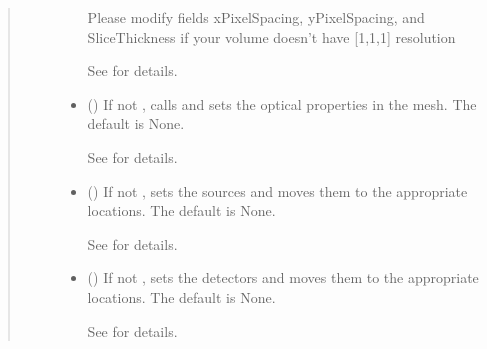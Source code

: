 \documentclass[letterpaper,10pt,english]{sphinxmanual}
\begin{document}
\begin{fulllineitems}
\begin{fulllineitems}
\begin{quote}
\begin{description}
\begin{itemize}
\sphinxAtStartPar
Please modify fields xPixelSpacing, yPixelSpacing, and SliceThickness if your volume doesn’t have {[}1,1,1{]} resolution

\sphinxAtStartPar
See {\hyperref[\detokenize{_autosummary/nirfasterff.utils.MeshingParams:nirfasterff.utils.MeshingParams}]{}} for details.


\item {} 
\sphinxAtStartPar
{} (\sphinxstyleliteralemphasis{\sphinxupquote{, }}) \textendash{} 
\sphinxAtStartPar
If not , calls  and sets the optical properties in the mesh. The default is None.

\sphinxAtStartPar
See {\hyperref[\detokenize{_autosummary/nirfasterff.base.fluor_mesh.fluormesh:nirfasterff.base.fluor_mesh.fluormesh.set_prop}]{}} for details.


\item {} 
\sphinxAtStartPar
{} (\sphinxstyleliteralemphasis{\sphinxupquote{, }}) \textendash{} 
\sphinxAtStartPar
If not , sets the sources and moves them to the appropriate locations. The default is None.

\sphinxAtStartPar
See {\hyperref[\detokenize{_autosummary/nirfasterff.base.optodes.optode:nirfasterff.base.optodes.optode.touch_sources}]{}} for details.


\item {} 
\sphinxAtStartPar
{} (\sphinxstyleliteralemphasis{\sphinxupquote{, }}) \textendash{} 
\sphinxAtStartPar
If not , sets the detectors and moves them to the appropriate locations. The default is None.

\sphinxAtStartPar
See {\hyperref[\detokenize{_autosummary/nirfasterff.base.optodes.optode:nirfasterff.base.optodes.optode.touch_detectors}]{}} for details.



\end{itemize}
\end{description}
\end{quote}
\end{fulllineitems}
\end{fulllineitems}
\end{document}
